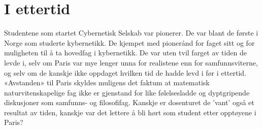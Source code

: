 \section{I ettertid}

Studentene som startet Cybernetisk Selskab var pionerer. De var blant de første i Norge som studerte kybernetikk. De kjempet med pionerånd for faget sitt og for muligheten til å ta hovedfag i kybernetikk. De var uten tvil farget av tiden de levde i, selv om Paris var mye lenger unna for realistene enn for samfunnsviterne, og selv om de kanskje ikke oppdaget hvilken tid de hadde levd i før i ettertid. «Avstanden» til Paris skyldes muligens det faktum at matematisk naturvitenskapelige fag ikke er gjenstand for like følelsesladde og dyptgripende diskusjoner som samfunns- og filosofifag. Kanskje er dosenturet de 'vant' også et resultat av tiden, kanskje var det lettere å bli hørt som student etter opptøyene i Paris?
